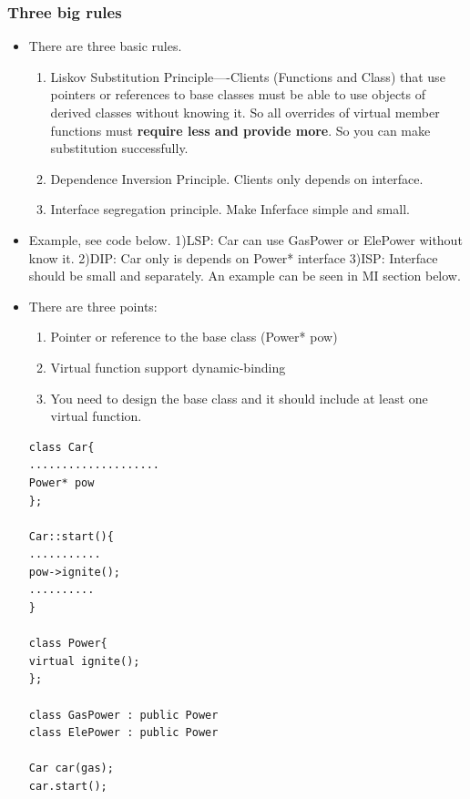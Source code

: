 \documentclass[a4paper,11pt,twoside]{book}
\begin{document}
\subsubsection{Three big rules}
\begin{itemize}
	\item There are three basic rules.
\begin{enumerate}
	\item Liskov Substitution Principle----Clients (Functions and Class) that use pointers or references to base classes must be able to use objects of derived classes without knowing it.  So all overrides of virtual member functions must \textbf{require less and provide more}. So you can make substitution successfully.
	
	\item Dependence Inversion Principle. Clients only depends on interface.
	
	\item Interface segregation principle. Make Inferface simple and small.
\end{enumerate}

\item Example, see code below.  1)LSP: Car can use  GasPower or ElePower without know it. 2)DIP: Car only is depends on Power* interface 3)ISP: Interface should be small and separately. An example can be seen in MI section below.

\item There are three points:
\begin{enumerate}
	\item Pointer or reference to the base class (Power* pow)
	\item Virtual function support dynamic-binding
	\item You need to design the base class and it should include at least one virtual function.
\end{enumerate}

\begin{lstlisting}[numbers=none]
class Car{
....................
Power* pow
};

Car::start(){
...........
pow->ignite();
..........
}

class Power{
virtual ignite();
};

class GasPower : public Power
class ElePower : public Power

Car car(gas);
car.start();
\end{lstlisting}

\end{itemize}
\end{document}
